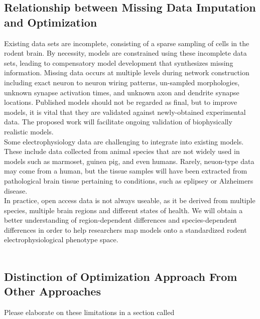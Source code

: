 \subsection{Relationship between Missing Data Imputation and Optimization}
Existing data sets are incomplete, consisting of a sparse sampling of cells in the rodent brain. By necessity, models are constrained using these incomplete data sets, leading to compensatory model development that synthesizes missing information. Missing data occurs at multiple levels during network construction including exact neuron to neuron wiring patterns, un-sampled morphologies, unknown synapse activation times, and unknown axon and dendrite synapse locations. Published models should not be regarded as final, but to improve models, it is vital that they are validated against newly-obtained experimental data. The proposed work will facilitate ongoing validation of biophysically realistic models. 
\\
Some electrophysiology data are challenging to integrate into existing models. These include data collected from animal species that are not widely used in models such as marmoset, guinea pig, and even humans.  Rarely, neuon-type data may come from a human, but the tissue samples will have been extracted from pathological brain tissue pertaining to conditions, such as eplipsey or Alzheimers disease.
\\
In practice, open access data is not always useable, as it be derived from multiple species, multiple brain regions and different states of health. We will obtain a better understanding of region-dependent differences and species-dependent differences in order to help researchers map models onto a standardized rodent electrophysiological phenotype space.\\
\\
\subsection{Distinction of Optimization Approach From Other Approaches}
Please elaborate on these limitations in a section called 



